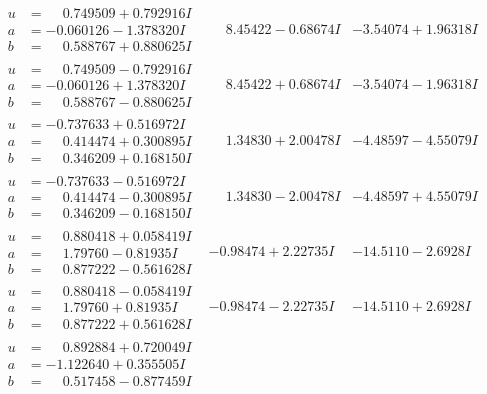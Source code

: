 \documentclass[1p]{elsarticle_modified}
\theoremstyle{definition}
\begin{document}
$$\begin{array}{c|c|c}
\begin{aligned}
u &= \phantom{-}0.749509 + 0.792916 I \\
a &= -0.060126 - 1.378320 I \\
b &= \phantom{-}0.588767 + 0.880625 I\end{aligned}
 & \phantom{-}8.45422 - 0.68674 I & -3.54074 + 1.96318 I \\ \hline\begin{aligned}
u &= \phantom{-}0.749509 - 0.792916 I \\
a &= -0.060126 + 1.378320 I \\
b &= \phantom{-}0.588767 - 0.880625 I\end{aligned}
 & \phantom{-}8.45422 + 0.68674 I & -3.54074 - 1.96318 I \\ \hline\begin{aligned}
u &= -0.737633 + 0.516972 I \\
a &= \phantom{-}0.414474 + 0.300895 I \\
b &= \phantom{-}0.346209 + 0.168150 I\end{aligned}
 & \phantom{-}1.34830 + 2.00478 I & -4.48597 - 4.55079 I \\ \hline\begin{aligned}
u &= -0.737633 - 0.516972 I \\
a &= \phantom{-}0.414474 - 0.300895 I \\
b &= \phantom{-}0.346209 - 0.168150 I\end{aligned}
 & \phantom{-}1.34830 - 2.00478 I & -4.48597 + 4.55079 I \\ \hline\begin{aligned}
u &= \phantom{-}0.880418 + 0.058419 I \\
a &= \phantom{-}1.79760 - 0.81935 I \\
b &= \phantom{-}0.877222 - 0.561628 I\end{aligned}
 & -0.98474 + 2.22735 I & -14.5110 - 2.6928 I \\ \hline\begin{aligned}
u &= \phantom{-}0.880418 - 0.058419 I \\
a &= \phantom{-}1.79760 + 0.81935 I \\
b &= \phantom{-}0.877222 + 0.561628 I\end{aligned}
 & -0.98474 - 2.22735 I & -14.5110 + 2.6928 I \\ \hline\begin{aligned}
u &= \phantom{-}0.892884 + 0.720049 I \\
a &= -1.122640 + 0.355505 I \\
b &= \phantom{-}0.517458 - 0.877459 I\end{aligned}

\end{array}$$
\end{document}

